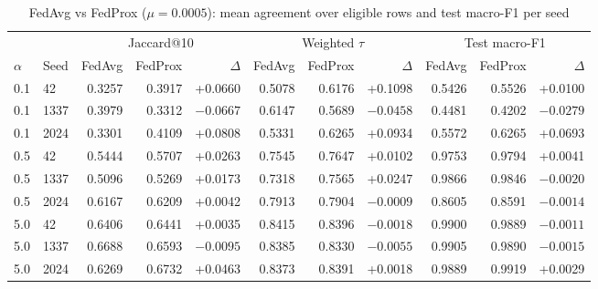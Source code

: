 \begin{table}[t]
\centering
\caption{FedAvg vs FedProx ($\mu=0.0005$): mean agreement over eligible rows and test macro-F1 per seed} %
\label{tab:fedprox}
\footnotesize
\begin{tabular}{@{}ll rrr rrr rrr@{}}
\toprule
 & & \multicolumn{3}{c}{Jaccard@10} & \multicolumn{3}{c}{Weighted $\tau$} & \multicolumn{3}{c}{Test macro-F1}\\
\cmidrule(lr){3-5}\cmidrule(lr){6-8}\cmidrule(l){9-11}
$\alpha$ & Seed & FedAvg & FedProx & $\Delta$ & FedAvg & FedProx & $\Delta$ & FedAvg & FedProx & $\Delta$\\
\midrule
0.1 & 42 & 0.3257 & 0.3917 & +0.0660 & 0.5078 & 0.6176 & +0.1098 & 0.5426 & 0.5526 & +0.0100\\ %
0.1 & 1337 & 0.3979 & 0.3312 & $-0.0667$ & 0.6147 & 0.5689 & $-0.0458$ & 0.4481 & 0.4202 & $-0.0279$\\ %
0.1 & 2024 & 0.3301 & 0.4109 & +0.0808 & 0.5331 & 0.6265 & +0.0934 & 0.5572 & 0.6265 & +0.0693\\ %
0.5 & 42 & 0.5444 & 0.5707 & +0.0263 & 0.7545 & 0.7647 & +0.0102 & 0.9753 & 0.9794 & +0.0041\\ %
0.5 & 1337 & 0.5096 & 0.5269 & +0.0173 & 0.7318 & 0.7565 & +0.0247 & 0.9866 & 0.9846 & $-0.0020$\\ %
0.5 & 2024 & 0.6167 & 0.6209 & +0.0042 & 0.7913 & 0.7904 & $-0.0009$ & 0.8605 & 0.8591 & $-0.0014$\\ %
5.0 & 42 & 0.6406 & 0.6441 & +0.0035 & 0.8415 & 0.8396 & $-0.0018$ & 0.9900 & 0.9889 & $-0.0011$\\ %
5.0 & 1337 & 0.6688 & 0.6593 & $-0.0095$ & 0.8385 & 0.8330 & $-0.0055$ & 0.9905 & 0.9890 & $-0.0015$\\ %
5.0 & 2024 & 0.6269 & 0.6732 & +0.0463 & 0.8373 & 0.8391 & +0.0018 & 0.9889 & 0.9919 & +0.0029\\ %
\bottomrule
\end{tabular}
\end{table}

